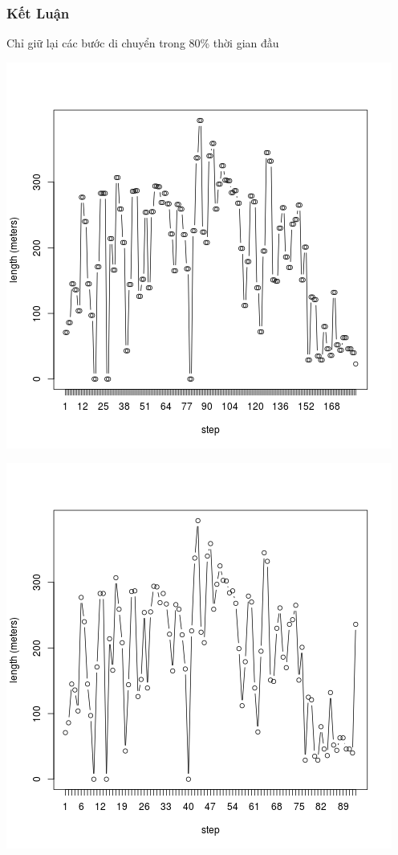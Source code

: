 \documentclass[t]{beamer}
\begin{document}
\begin{frame}[t]
\frametitle{Kết Luận}Chỉ giữ lại các bước di chuyển trong 80\% thời gian đầu\\
\begin{center}
\begin{minipage}{0.48\linewidth}
\includegraphics[width=\linewidth]{test1}
\end{minipage}%
\hfill
\begin{minipage}{0.49\linewidth}
\includegraphics[width=\linewidth]{test_80_1}
\end{minipage}
\end{center}
\end{frame}
\end{document}
